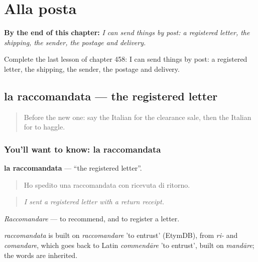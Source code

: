 
\chapter{Alla posta}
\label{ch:it-alla-posta}

\begin{chapteropening}
\textbf{By the end of this chapter:} \emph{I can send things by post: a registered letter, the shipping, the sender, the postage and delivery.}

Complete the last lesson of chapter 458: I can send things by post: a registered letter, the shipping, the sender, the postage and delivery.
\end{chapteropening}

\section[la raccomandata]{la raccomandata — the registered letter}

\label{lesson:IT-C458-raccomandata}



\begin{quote}
Before the new one: say the Italian for the clearance sale, then the Italian for to haggle.
\end{quote}

\subsection*{You'll want to know: la raccomandata}
\textbf{la raccomandata} — \textquotedblleft{}the registered letter\textquotedblright{}.

\begin{quote}
Ho spedito una raccomandata con ricevuta di ritorno.
\end{quote}

\begin{quote}
\emph{I sent a registered letter with a return receipt.}
\end{quote}

\emph{Raccomandare} — to recommend, and to register a letter.

\begin{cousinweb}
\emph{raccomandata} is built on \emph{raccomandare} 'to entrust' (EtymDB), from \emph{ri-} and \emph{comandare}, which goes back to Latin \emph{commendāre} 'to entrust', built on \emph{mandāre}; the words are inherited.
\end{cousinweb}

